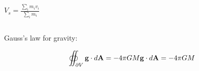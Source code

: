 \documentclass{report}
\begin{document}
\chapter{}

\section{}

\subsection{}
$V_s=\frac{\sum_i m_i v_i}{\sum_i m_i}$

\subsection{}

\subsection{}

\section{}
Gauss's law for gravity:

$$\oiint_{\displaystyle \scriptstyle \partial V} {\displaystyle \mathbf {g} \cdot d\mathbf {A} =-4\pi GM} \mathbf {g} \cdot d\mathbf {A} =-4\pi GM$$

\section{}

\subsection{}

\subsection{}

\chapter{}

\chapter{}
\end{document}
